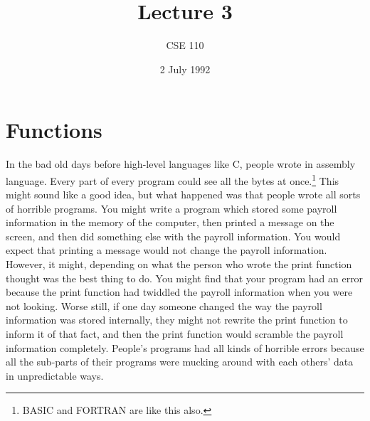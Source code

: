 %
%
%


\def\brac#1{$<$#1$>$}
\def\Int{{\tt int}}
\def\int{\brac{\Int}}
\def\int{\brac{\Int}}
\def\Shortint{{\tt short~int}}
\def\shortint{\brac{\Shortint}}
\def\Longint{{\tt long~int}}
\def\longint{\brac{\Longint}}
\def\Float{{\tt float}}
\def\float{\brac{\Float}}
\def\Double{{\tt double}}
\def\double{\brac{\Double}}
\def\Char{{\tt char}}
\def\char{\brac{\Char}}
\def\Void{{\tt void}}
\def\void{\brac{\Void}}

\def\p2#1{\brac{pointer~to #1}}

\parskip 8pt

\title{Lecture 3}
\author{CSE 110}
\date{2 July 1992}

\pagestyle{fancy}
\rhead{\thepage}
\cfoot{}





\maketitle


\section{Functions}

    In the bad old days before high-level languages like C, people wrote
in assembly language.  Every part of every program could see all the
bytes at once.\footnote{BASIC and FORTRAN are like this also.} This
might sound like a good idea, but what happened was that people wrote
all sorts of horrible programs.  You might write a program which stored
some payroll information in the memory of the computer, then printed a
message on the screen, and then did something else with the payroll
information.  You would expect that printing a message would not change
the payroll information.  However, it might, depending on what the
person who wrote the print function thought was the best thing to do.
You might find that your program had an error because the print function
had twiddled the payroll information when you were not looking.  Worse
still, if one day someone changed the way the payroll information was
stored internally, they might not rewrite the print function to inform
it of that fact, and then the print function would scramble the payroll
information completely.  People's programs had all kinds of horrible
errors because all the sub-parts of their programs were mucking around
with each others' data in unpredictable ways.

